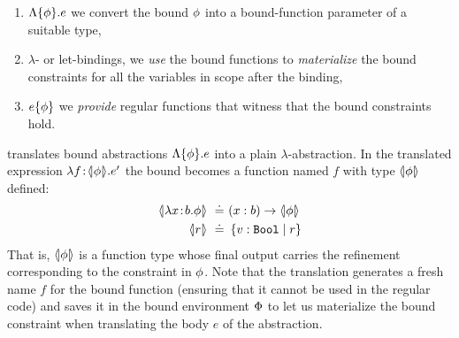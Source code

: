 \begin{enumerate}
%
\item {} $\Lambda \{\phi \} . e $
 we convert the bound $\phi$ into a bound-function
 parameter of a suitable type,
%
\item {} \ie $\lambda$- or let-bindings,
 we \emph{use} the bound functions to \emph{materialize} the
 bound constraints for all the variables in scope after the binding,
%
\item {} $ e \{ \phi \} $
 we \emph{provide} regular functions that witness that the bound constraints hold.
%
\end{enumerate}



 translates bound abstractions
$\Lambda \{\phi \} . e $ into a plain $\lambda$-abstraction.
%
In the translated expression $\lambda {f\!:\!\ensuremath{\langle\!| \phi |\!\rangle}}. e'$
the bound becomes a function named $f$ with type
$\langle\!| \phi |\!\rangle$ defined:
%
\begin{align*}
\txbound{\efunt{x}{b}{\constraint}} \defeq & \tfun{x}{b}{\txbound{\constraint}}\\
\txbound{r} \defeq & \tref{\tbbool}{r}
\end{align*}
%
That is, $\langle\!| \phi |\!\rangle$ is a function type whose
final output carries the refinement corresponding to
the constraint in $\phi$.
%
Note that the translation generates a fresh name $f$ for
the bound function (ensuring that it cannot be used in
the regular code) and saves it in the bound environment
$\Phi$ to let us materialize the bound constraint when
translating the body $e$ of the abstraction.

